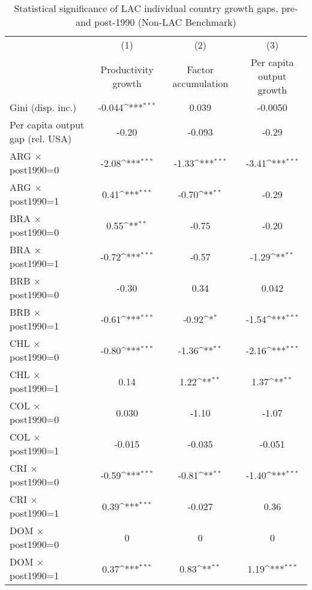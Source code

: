 \begin{sidewaystable}[htbp]\centering
\def\sym#1{\ifmmode^{#1}\else\(^{#1}\)\fi}
\caption{Statistical significance of LAC individual country growth gaps, pre- and post-1990 (Non-LAC Benchmark)}
\begin{tabular}{l*{3}{c}}
\toprule
                &\multicolumn{1}{c}{(1)}&\multicolumn{1}{c}{(2)}&\multicolumn{1}{c}{(3)}\\
                &\multicolumn{1}{c}{Productivity growth}&\multicolumn{1}{c}{Factor accumulation}&\multicolumn{1}{c}{Per capita output growth}\\
\midrule
Gini (disp. inc.)&   -0.044\sym{***}&    0.039         &  -0.0050         \\
Per capita output gap (rel. USA)&    -0.20         &   -0.093         &    -0.29         \\
ARG $\times$ post1990=0&    -2.08\sym{***}&    -1.33\sym{***}&    -3.41\sym{***}\\
ARG $\times$ post1990=1&     0.41\sym{***}&    -0.70\sym{**} &    -0.29         \\
BRA $\times$ post1990=0&     0.55\sym{**} &    -0.75         &    -0.20         \\
BRA $\times$ post1990=1&    -0.72\sym{***}&    -0.57         &    -1.29\sym{**} \\
BRB $\times$ post1990=0&    -0.30         &     0.34         &    0.042         \\
BRB $\times$ post1990=1&    -0.61\sym{***}&    -0.92\sym{*}  &    -1.54\sym{***}\\
CHL $\times$ post1990=0&    -0.80\sym{***}&    -1.36\sym{**} &    -2.16\sym{***}\\
CHL $\times$ post1990=1&     0.14         &     1.22\sym{**} &     1.37\sym{**} \\
COL $\times$ post1990=0&    0.030         &    -1.10         &    -1.07         \\
COL $\times$ post1990=1&   -0.015         &   -0.035         &   -0.051         \\
CRI $\times$ post1990=0&    -0.59\sym{***}&    -0.81\sym{**} &    -1.40\sym{***}\\
CRI $\times$ post1990=1&     0.39\sym{***}&   -0.027         &     0.36         \\
DOM $\times$ post1990=0&        0         &        0         &        0         \\
DOM $\times$ post1990=1&     0.37\sym{***}&     0.83\sym{**} &     1.19\sym{***}\\

\end{tabular}
\end{sidewaystable}
